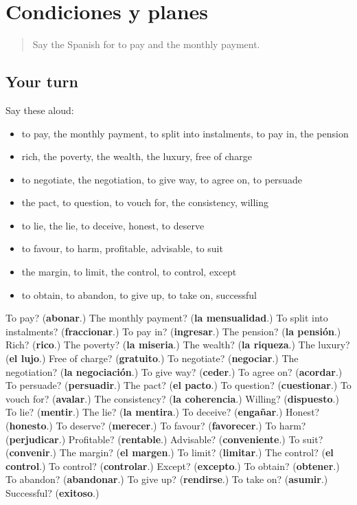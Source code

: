 \section[(dialogue)]{Condiciones y planes}

\label{lesson:ES-R639-repaso-632-639}



\begin{quote}
Say the Spanish for to pay and the monthly payment.
\end{quote}

\subsection*{Your turn}
Say these aloud:

\begin{itemize}
\raggedright
  \item to pay, the monthly payment, to split into instalments, to pay in, the pension
  \item rich, the poverty, the wealth, the luxury, free of charge
  \item to negotiate, the negotiation, to give way, to agree on, to persuade
  \item the pact, to question, to vouch for, the consistency, willing
  \item to lie, the lie, to deceive, honest, to deserve
  \item to favour, to harm, profitable, advisable, to suit
  \item the margin, to limit, the control, to control, except
  \item to obtain, to abandon, to give up, to take on, successful
\end{itemize}

\begin{tcolorbox}[breakable,colback=teal!4,colframe=teal!35!black,title={Before you move on}]
To pay? (\textbf{abonar}.) The monthly payment? (\textbf{la mensualidad}.) To split into instalments? (\textbf{fraccionar}.) To pay in? (\textbf{ingresar}.) The pension? (\textbf{la pensión}.) Rich? (\textbf{rico}.) The poverty? (\textbf{la miseria}.) The wealth? (\textbf{la riqueza}.) The luxury? (\textbf{el lujo}.) Free of charge? (\textbf{gratuito}.) To negotiate? (\textbf{negociar}.) The negotiation? (\textbf{la negociación}.) To give way? (\textbf{ceder}.) To agree on? (\textbf{acordar}.) To persuade? (\textbf{persuadir}.) The pact? (\textbf{el pacto}.) To question? (\textbf{cuestionar}.) To vouch for? (\textbf{avalar}.) The consistency? (\textbf{la coherencia}.) Willing? (\textbf{dispuesto}.) To lie? (\textbf{mentir}.) The lie? (\textbf{la mentira}.) To deceive? (\textbf{engañar}.) Honest? (\textbf{honesto}.) To deserve? (\textbf{merecer}.) To favour? (\textbf{favorecer}.) To harm? (\textbf{perjudicar}.) Profitable? (\textbf{rentable}.) Advisable? (\textbf{conveniente}.) To suit? (\textbf{convenir}.) The margin? (\textbf{el margen}.) To limit? (\textbf{limitar}.) The control? (\textbf{el control}.) To control? (\textbf{controlar}.) Except? (\textbf{excepto}.) To obtain? (\textbf{obtener}.) To abandon? (\textbf{abandonar}.) To give up? (\textbf{rendirse}.) To take on? (\textbf{asumir}.) Successful? (\textbf{exitoso}.)
\end{tcolorbox}
